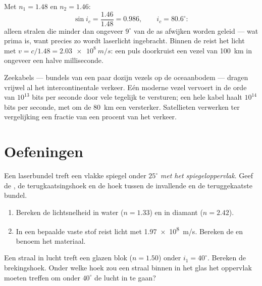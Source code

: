 \begin{example}\label{ex:g10:refraction:fibernumbers}
Met $n_1 = 1.48$ en $n_2 = 1.46$:
\[
\sin i_c = \frac{1.46}{1.48} = 0.986,
\qquad i_c = 80.6^\circ :
\]
alleen stralen die minder dan ongeveer $9^\circ$ van de as afwijken
worden geleid --- wat prima is, want precies zo wordt laserlicht
ingebracht. Binnen de  reist het licht met
$v = c/1.48 = \qty{2.03e8}{m/s}$: een puls doorkruist een vezel van
\qty{100}{km} in ongeveer een halve milliseconde.
\end{example}

\begin{remark}\label{rem:g10:refraction:datarates}
Zeekabels --- bundels van een paar dozijn vezels op de oceaanbodem ---
dragen vrijwel al het intercontinentale verkeer. Eén moderne vezel
vervoert in de orde van $10^{13}$ bits per seconde door vele 
tegelijk te versturen; een hele kabel haalt $10^{14}$ bits per seconde,
met om de \qty{80}{km} een versterker. Satellieten verwerken ter
vergelijking een fractie van een procent van het verkeer.
\end{remark}

\section{Oefeningen}

\begin{exercise}[$\star$]\label{exo:g10:refraction:1}
Een laserbundel treft een vlakke spiegel onder $25^\circ$ \emph{met het
spiegeloppervlak}. Geef de , de terugkaatsingshoek en de hoek
tussen de invallende en de teruggekaatste bundel.
\end{exercise}

\begin{exercise}[$\star$]\label{exo:g10:refraction:2}
\begin{enumerate}
  \item Bereken de lichtsnelheid in water ($n = 1.33$) en in diamant
        ($n = 2.42$).
  \item In een bepaalde vaste stof reist licht met \qty{1.97e8}{m/s}.
        Bereken de  en benoem het materiaal.
\end{enumerate}
\end{exercise}

\begin{exercise}[$\star$]\label{exo:g10:refraction:3}
Een straal in lucht treft een glazen blok ($n = 1.50$) onder
$i_1 = 40^\circ$. Bereken de brekingshoek. Onder welke hoek zou een
straal binnen in het glas het oppervlak moeten treffen om onder
$40^\circ$ de lucht in te gaan?
\end{exercise}

